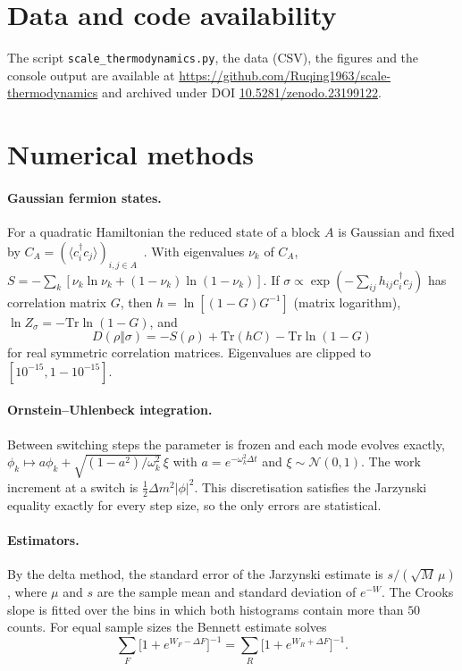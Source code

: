 \documentclass[11pt]{article}
\theoremstyle{remark}\newtheorem*{remark}{Remark}
\newcommand{\Tr}{\mathrm{Tr}}
\newcommand{\paperdoi}{10.5281/zenodo.23199122}
\begin{document}
\section*{Data and code availability}
The script \texttt{scale\_thermodynamics.py}, the data (CSV), the figures and the console output are available at
\url{https://github.com/Ruqing1963/scale-thermodynamics} and archived under DOI
\href{https://doi.org/\paperdoi}{\paperdoi}.

\appendix
\section{Numerical methods}
\label{app:methods}

\paragraph{Gaussian fermion states.}
For a quadratic Hamiltonian the reduced state of a block $A$ is Gaussian and fixed by $C_A=(\langle c_i^\dagger
c_j\rangle)_{i,j\in A}$~\cite{Peschel}. With eigenvalues $\nu_k$ of $C_A$,
$S=-\sum_k[\nu_k\ln\nu_k+(1-\nu_k)\ln(1-\nu_k)]$. If $\sigma\propto\exp(-\sum_{ij}h_{ij}c_i^\dagger c_j)$ has
correlation matrix $G$, then $h=\ln[(1-G)G^{-1}]$ (matrix logarithm), $\ln Z_\sigma=-\Tr\ln(1-G)$, and
\begin{equation}
D(\rho\Vert\sigma)=-S(\rho)+\Tr(hC)-\Tr\ln(1-G)
\end{equation}
for real symmetric correlation matrices. Eigenvalues are clipped to $[10^{-15},1-10^{-15}]$.

\paragraph{Ornstein--Uhlenbeck integration.}
Between switching steps the parameter is frozen and each mode evolves exactly,
$\phi_k\mapsto a\phi_k+\sqrt{(1-a^2)/\omega_k^2}\,\xi$ with $a=e^{-\omega_k^2\Delta t}$ and $\xi\sim\mathcal N(0,1)$. The
work increment at a switch is $\tfrac12\Delta m^2|\phi|^2$. This discretisation satisfies the Jarzynski equality
exactly for every step size, so the only errors are statistical.

\paragraph{Estimators.}
By the delta method, the standard error of the Jarzynski estimate is $s/(\sqrt M\,\mu)$, where $\mu$ and $s$
are the sample mean and standard deviation of $e^{-W}$. The Crooks slope is fitted over the bins in which both histograms contain more than $50$ counts. For equal sample sizes the Bennett
estimate solves
\begin{equation*}
\sum_F\bigl[1+e^{W_F-\Delta F}\bigr]^{-1}=\sum_R\bigl[1+e^{W_R+\Delta F}\bigr]^{-1}.
\end{equation*}
\end{document}
